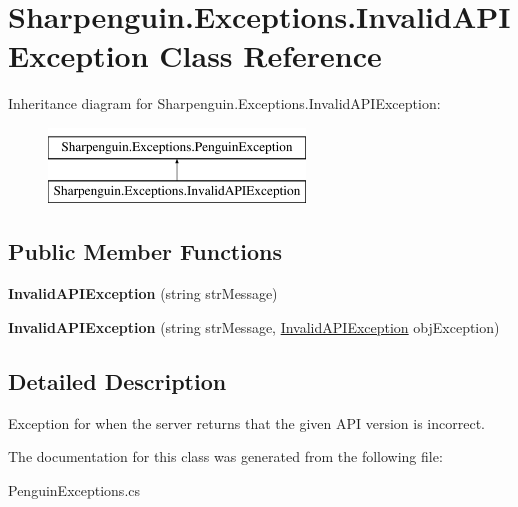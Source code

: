 \hypertarget{classSharpenguin_1_1Exceptions_1_1InvalidAPIException}{\section{Sharpenguin.\-Exceptions.\-Invalid\-A\-P\-I\-Exception Class Reference}
\label{classSharpenguin_1_1Exceptions_1_1InvalidAPIException}
}
Inheritance diagram for Sharpenguin.\-Exceptions.\-Invalid\-A\-P\-I\-Exception\-:\begin{figure}[H]
\begin{center}
\leavevmode
\includegraphics[height=2.000000cm]{classSharpenguin_1_1Exceptions_1_1InvalidAPIException}
\end{center}
\end{figure}
\subsection*{Public Member Functions}
\begin{DoxyCompactItemize}
\item 
\hypertarget{classSharpenguin_1_1Exceptions_1_1InvalidAPIException_a9f21411ded099d6ae5911a909bdec7c0}{{\bfseries Invalid\-A\-P\-I\-Exception} (string str\-Message)}\label{classSharpenguin_1_1Exceptions_1_1InvalidAPIException_a9f21411ded099d6ae5911a909bdec7c0}

\item 
\hypertarget{classSharpenguin_1_1Exceptions_1_1InvalidAPIException_a8e7238721e0246b07b37c6fef5a83de0}{{\bfseries Invalid\-A\-P\-I\-Exception} (string str\-Message, \hyperlink{classSharpenguin_1_1Exceptions_1_1InvalidAPIException}{Invalid\-A\-P\-I\-Exception} obj\-Exception)}\label{classSharpenguin_1_1Exceptions_1_1InvalidAPIException_a8e7238721e0246b07b37c6fef5a83de0}

\end{DoxyCompactItemize}


\subsection{Detailed Description}
Exception for when the server returns that the given A\-P\-I version is incorrect. 

The documentation for this class was generated from the following file\-:\begin{DoxyCompactItemize}
\item 
Penguin\-Exceptions.\-cs\end{DoxyCompactItemize}

